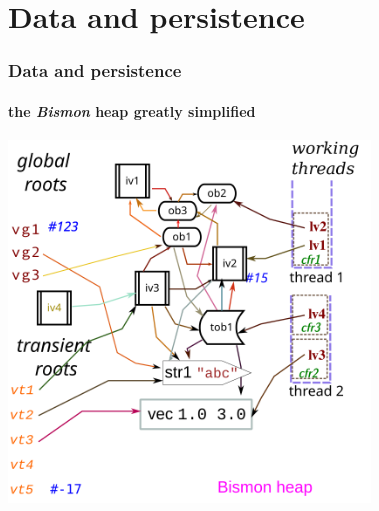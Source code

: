 \documentclass[xcolor=svgnames,final,smaller,a4]{beamer}
\begin{document}
\section{Data and persistence}

\begin{frame}
    \frametitle{Data and persistence}
    \framesubtitle{the \emph{Bismon} heap \textbf{\large greatly simplified} {}}

    \begin{center}
      \includegraphics[width=0.72\textwidth]{heap-bismon}
    \end{center}
\end{frame}
\end{document}
